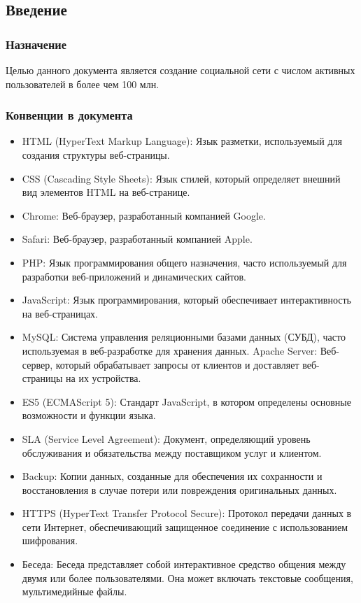 \subsection{Введение}
\subsubsection{Назначение}
Целью данного документа является создание социальной сети с числом активных
пользователей в более чем 100 млн.

\subsubsection{Конвенции в документа}
\begin{itemize}
\item HTML (HyperText Markup Language): Язык разметки, используемый для создания структуры веб-страницы.
\item CSS (Cascading Style Sheets): Язык стилей, который определяет внешний вид элементов HTML на веб-странице.
\item Chrome: Веб-браузер, разработанный компанией Google.
\item Safari: Веб-браузер, разработанный компанией Apple.
\item PHP: Язык программирования общего назначения, часто используемый для разработки веб-приложений и динамических сайтов.
\item JavaScript: Язык программирования, который обеспечивает интерактивность на веб-страницах.
\item MySQL: Система управления реляционными базами данных (СУБД), часто используемая в веб-разработке для хранения данных.
Apache Server: Веб-сервер, который обрабатывает запросы от клиентов и доставляет веб-страницы на их устройства.
\item ES5 (ECMAScript 5): Стандарт JavaScript, в котором определены основные возможности и функции языка.
\item SLA (Service Level Agreement): Документ, определяющий уровень обслуживания и обязательства между поставщиком услуг и клиентом.
\item Backup: Копии данных, созданные для обеспечения их сохранности и восстановления в случае потери или повреждения оригинальных данных.
\item HTTPS (HyperText Transfer Protocol Secure): Протокол передачи данных в сети Интернет, обеспечивающий защищенное соединение с использованием шифрования.
\item Беседа:
  Беседа представляет собой интерактивное средство общения между двумя или более пользователями. Она может включать текстовые сообщения, мультимедийные файлы.

\end{itemize}
